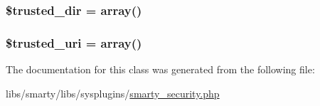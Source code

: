 \subsubsection[{\$trusted\+\_\+dir}]{\setlength{\rightskip}{0pt plus 5cm}\$trusted\+\_\+dir = array()}\label{class_smarty___security_a4541edfa0e2dd6b0e4b1da10c14fa52c}
\hypertarget{class_smarty___security_acac0932b45462f6ec294170ba2398970}{}
\subsubsection[{\$trusted\+\_\+uri}]{\setlength{\rightskip}{0pt plus 5cm}\$trusted\+\_\+uri = array()}\label{class_smarty___security_acac0932b45462f6ec294170ba2398970}


The documentation for this class was generated from the following file\+:\begin{DoxyCompactItemize}
\item 
libs/smarty/libs/sysplugins/\hyperlink{smarty__security_8php}{smarty\+\_\+security.\+php}\end{DoxyCompactItemize}
